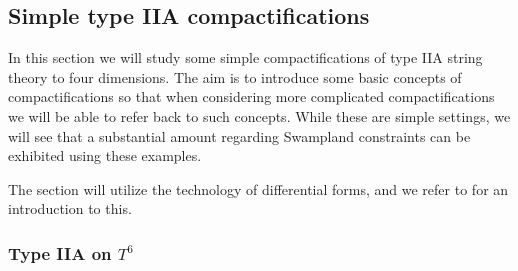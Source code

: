 \documentclass[11pt,a4paper]{article}
\numberwithin{equation}{section}
\numberwithin{table}{section}\setlength{\multlinegap}{25pt}
\begin{document}
\subsection{Simple type IIA compactifications}
\label{sec:simpleiia}

In this section we will study some simple compactifications of type IIA string theory to four dimensions. The aim is to introduce some basic concepts of compactifications so that when considering more complicated compactifications we will be able to refer back to such concepts. While these are simple settings, we will see that a substantial amount regarding Swampland constraints can be exhibited using these examples. 

The section will utilize the technology of differential forms, and we refer to \cite{Nakahara2003geometry} for an introduction to this.

\subsubsection{Type IIA on $T^6$}
\label{sec:iiaont6}
\end{document}
